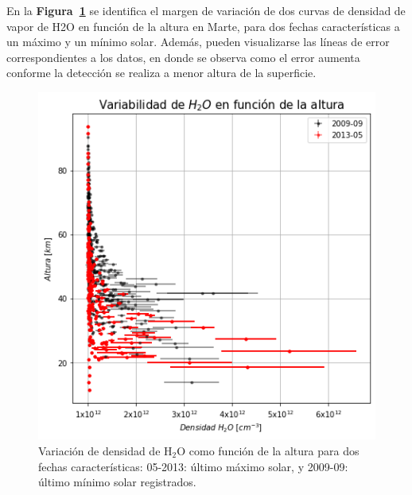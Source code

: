 \documentclass[a4paper,alpha-refs]{eSpectra}
\begin{document}
En la \textbf{Figura~\ref{fig:resultados}} se identifica el margen de variaci\'on de dos curvas de densidad de vapor de H2O en funci\'on de la altura en Marte, para dos fechas caracter\'isticas a un m\'aximo y un m\'inimo solar. Adem\'as, pueden visualizarse las l\'ineas de error correspondientes a los datos, en donde se observa como el error aumenta conforme la detecci\'on se realiza a menor altura de la superficie.

\begin{figure}
\centering
	\includegraphics[width=\columnwidth, scale=1]{Imagenes/H2Ovsaltura.png}
    \caption{Variaci\'on de densidad de H$_2$O como funci\'on de la altura para dos fechas características: 05-2013: \'ultimo máximo solar, y 2009-09: \'ultimo m\'inimo solar registrados.  }
    \label{fig:resultados}
\end{figure}
\end{document}

